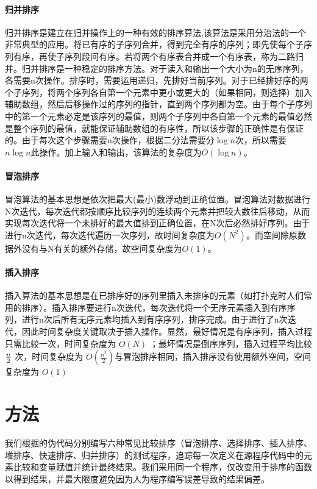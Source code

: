 \documentclass[UTF8]{ctexart}
\begin{document}
\paragraph{归并排序}
归并排序\cite{cormen1990introduction}是建立在归并操作上的一种有效的排序算法,该算法是采用分治法的一个非常典型的应用。将已有序的子序列合并，得到完全有序的序列；即先使每个子序列有序，再使子序列段间有序。若将两个有序表合并成一个有序表，称为二路归并。归并排序是一种稳定的排序方法。对于读入和输出一个大小为n的无序序列，各需要n次操作。排序时，需要运用递归，先排好当前序列。对于已经排好序的两个子序列，将两个序列各自第一个元素中更小或更大的（如果相同，则选择）加入辅助数组，然后后移操作过的序列的指针，直到两个序列都为空。由于每个子序列中的第一个元素必定是该序列的最值，则两个子序列中各自第一个元素的最值必然是整个序列的最值，就能保证辅助数组的有序性，所以该步骤的正确性是有保证的。由于每次这个步骤需要n次操作，根据二分法需要分$\log n$次，所以需要$n \log n$此操作。加上输入和输出，该算法的复杂度为$O(\log n)$。

\paragraph{冒泡排序}
冒泡算法\cite{cormen1990introduction}的基本思想是依次把最大(最小)数浮动到正确位置。冒泡算法对数据进行N次迭代，每次迭代都按顺序比较序列的连续两个元素并把较大数往后移动，从而实现每次迭代将一个未排好的最大值排到正确位置，在N次后必然排好序列。由于进行n次迭代，每次迭代遍历一次序列，故时间复杂度为$O(N^2)$。而空间除原数据外没有与N有关的额外存储，故空间复杂度为$O(1)$。

\paragraph{插入排序}
插入算法的基本思想是在已排序好的序列里插入未排序的元素（如打扑克时人们常用的排序）。插入排序\cite{cormen1990introduction}要进行n次迭代，每次迭代将一个无序元素插入到有序序列，进行n次后所有无序元素均插入到有序序列，排序完成。由于进行了n次迭代，因此时间复杂度关键取决于插入操作。显然，最好情况是有序序列，插入过程只需比较一次，时间复杂度为 $O(N)$ ；最坏情况是倒序序列，插入过程平均比较 $n \over 2$ 次，时间复杂度为 $O(\frac{n^2}{2})$与冒泡排序相同，插入排序没有使用额外空间，空间复杂度为 $O(1)$

\section{方法}
我们根据\citeauthor{cormen1990introduction}的伪代码分别编写六种常见比较排序（冒泡排序、选择排序、插入排序、堆排序、快速排序、归并排序）的测试程序，追踪每一次定义在源程序代码中的元素比较和变量赋值并统计最终结果。我们采用同一个程序，仅改变用于排序的函数以得到结果，并最大限度避免因为人为程序编写误差导致的结果偏差。
\end{document}
